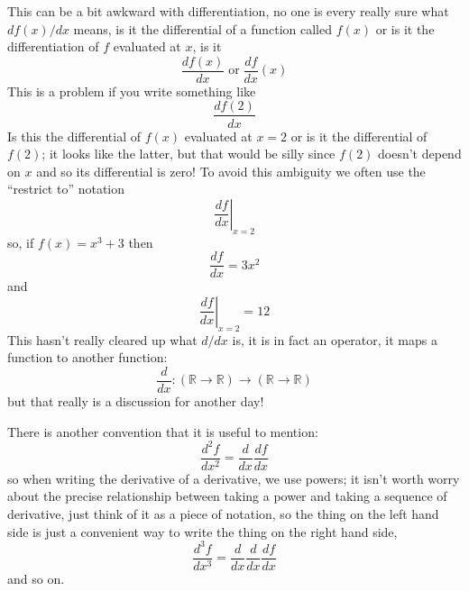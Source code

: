 \documentclass[12pt]{article}
\begin{document}
This can be a bit awkward with differentiation, no one is every really
sure what $df(x)/dx$ means, is it the differential of a function
called $f(x)$ or is it the differentiation of $f$ evaluated at $x$, is it
\begin{equation}
  \frac{df(x)}{dx}\;\mbox{or}\;\frac{df}{dx}(x)
\end{equation}
This is a problem if you write something like
\begin{equation}
  \frac{df(2)}{dx}
\end{equation}
Is this the differential of $f(x)$ evaluated at $x=2$ or is it the
differential of $f(2)$; it looks like the latter, but that would be
silly since $f(2)$ doesn't depend on $x$ and so its differential is
zero! To avoid this ambiguity we often use the ``restrict to'' notation
\begin{equation}
  \left.\frac{df}{dx}\right|_{x=2}
\end{equation}
so, if $f(x)=x^3+3$ then
\begin{equation}
  \frac{df}{dx}=3x^2
\end{equation}
and
\begin{equation}
  \left.\frac{df}{dx}\right|_{x=2}=12
\end{equation}
This hasn't really cleared up what $d/dx$ is, it is in fact an operator, it maps a function to another function:
\begin{equation}
  \frac{d}{dx}:(\mathbb{R}\rightarrow\mathbb{R})\rightarrow(\mathbb{R}\rightarrow\mathbb{R})
\end{equation}
but that really is a discussion for another day!

There is another convention that it is useful to mention:
\begin{equation}
  \frac{d^2f}{dx^2}=\frac{d}{dx}\frac{df}{dx}
\end{equation}
so when writing the derivative of a derivative, we use powers; it
isn't worth worry about the precise relationship between taking a
power and taking a sequence of derivative, just think of it as a piece of notation, so the thing on the left hand side is just a convenient way to write the thing on the right hand side,
\begin{equation}
  \frac{d^3f}{dx^3}=\frac{d}{dx}\frac{d}{dx}\frac{df}{dx}
\end{equation}
and so on.
\end{document}
